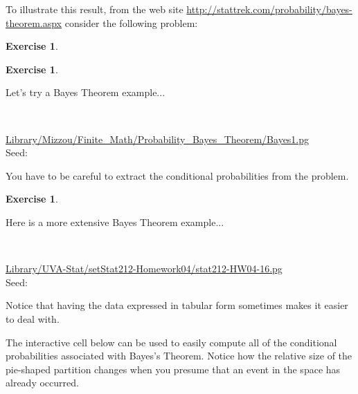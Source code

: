 \documentclass[10pt,]{book}
\theoremstyle{plain}
\theoremstyle{definition}
\theoremstyle{definition}
\theoremstyle{definition}
\newtheorem{exercise}[theorem]{Exercise}
\numberwithin{equation}{section}
\begin{document}
	To illustrate this result, from the web site \url{http://stattrek.com/probability/bayes-theorem.aspx} consider the following problem:
\begin{exercise}\label{exercise-29}
\end{exercise}
\begin{exercise}\label{exercise-30}

	Let's try a Bayes Theorem example...
\par\medskip
\mbox{}\\ %
\begin{mdframed}
{}\par\vspace*{2ex}%
{\tiny\ttfamily\noindent\url{Library/Mizzou/Finite_Math/Probability_Bayes_Theorem/Bayes1.pg}\\Seed: \hfill}\end{mdframed}
\medskip\noindent 
	You have to be careful to extract the conditional probabilities from the problem.
\par
\end{exercise}
\begin{exercise}\label{exercise-31}

	Here is a more extensive Bayes Theorem example...
\par\medskip
\mbox{}\\ %
\begin{mdframed}
{}\par\vspace*{2ex}%
{\tiny\ttfamily\noindent\url{Library/UVA-Stat/setStat212-Homework04/stat212-HW04-16.pg}\\Seed: \hfill}\end{mdframed}
\medskip\noindent 
	Notice that having the data expressed in tabular form sometimes makes it easier to deal with.
\par
\end{exercise}
\par
The interactive cell below can be used to easily compute all of the conditional probabilities associated with Bayes's Theorem. Notice how the relative size of the pie-shaped partition changes when you presume that an event in the space has already occurred.%
\end{document}

